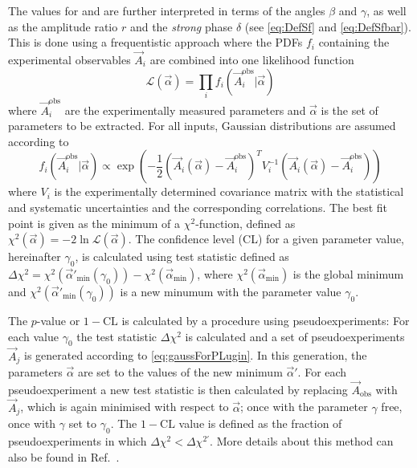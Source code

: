 The values for \Sf and \Sfbar are further interpreted in terms of the angles $\beta$ and $\gamma$, as well as the amplitude ratio $r$ and the \emph{strong} phase $\delta$ (see \cref{eq:DefSf} and \eqref{eq:DefSfbar}).
This is done using a frequentistic approach where  the PDFs $f_i$ containing the experimental observables $\vec{A}_i$ are combined into one likelihood function
\begin{equation}
\mathcal{L}(\vec{\alpha})=\prod_i f_i\left(\vec{A}_i^{\text{obs}}\big|\vec{\alpha}\right)
\end{equation}
where $\vec{A}_i^{\text{obs}}$ are the experimentally measured parameters and $\vec{\alpha}$ is the set of parameters to be extracted.
For all inputs, Gaussian distributions are assumed according to
\begin{equation}
f_i\left(\vec{A}_i^{\text{obs}}\big|\vec{\alpha}\right)\propto\exp\!\left(-\frac{1}{2}\left(\vec{A}_i(\vec{\alpha})-\vec{A}_i^{\text{obs}}\right)^T V_i^{-1}\left(\vec{A}_i(\vec{\alpha})-\vec{A}_i^{\text{obs}}\right)\right)\label{eq:gaussForPLugin}
\end{equation}
where $V_i$ is the experimentally determined covariance matrix with the statistical and systematic uncertainties and the corresponding correlations.
The best fit point is given as the minimum of a $\chi^2$-function, defined as $\chi^2(\vec{\alpha})=-2\ln\mathcal{L}(\vec{\alpha})$.
The confidence level (CL) for a given parameter value, hereinafter $\gamma_0$, is calculated using test statistic defined as $\Delta\chi^2=\chi^2(\vec{\alpha}'_{\text{min}}(\gamma_0))-\chi^2(\vec{\alpha}_{\text{min}})$, where $\chi^2(\vec{\alpha}_{\text{min}})$ is the global minimum and $\chi^2(\vec{\alpha}'_{\text{min}}(\gamma_0))$ is a new minumum with the parameter value $\gamma_0$.

The $p$-value or $1-\text{CL}$ is calculated by a procedure using pseudoexperiments:
For each value $\gamma_0$ the test statistic $\Delta\chi^2$ is calculated and a set of pseudoexperiments $\vec{A}_j$ is generated according to \cref{eq:gaussForPLugin}.
In this generation, the parameters $\vec{\alpha}$ are set to the values of the new minimum $\vec{\alpha}'$.
For each pseudoexperiment a new test statistic is then calculated by replacing $\vec{A}_{\text{obs}}$ with $\vec{A}_j$, which is again minimised with respect to $\vec{\alpha}$; once with the parameter $\gamma$ free, once with $\gamma$ set to $\gamma_0$.
The $1-\text{CL}$ value is defined as the fraction of pseudoexperiments in which $\Delta\chi^2<\Delta\chi^{2'}$.
More details about this method can also be found in Ref.~\cite{Bodhisattva:2009uba}.

